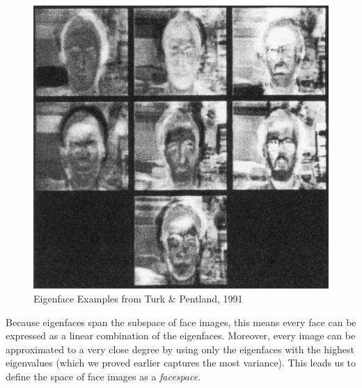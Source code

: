 \documentclass{article}
\begin{document}
\vspace{3mm}

\noindent{}
\begin{figure}[h]
    \centering
    \includegraphics[scale=0.18]{images/eigenface.png}
    \caption{Eigenface Examples from Turk \& Pentland, 1991}
\end{figure}

\noindent Because eigenfaces span the subspace of face images, this means every face can be expressed as a linear combination of the eigenfaces. Moreover, every image can be approximated to a very close degree by using only the eigenfaces with the highest eigenvalues (which we proved earlier captures the most variance). This leads us to define the space of face images as a \textit{facespace}.

\vspace{3mm}

\noindent{}

\vspace{3mm}
\end{document}
